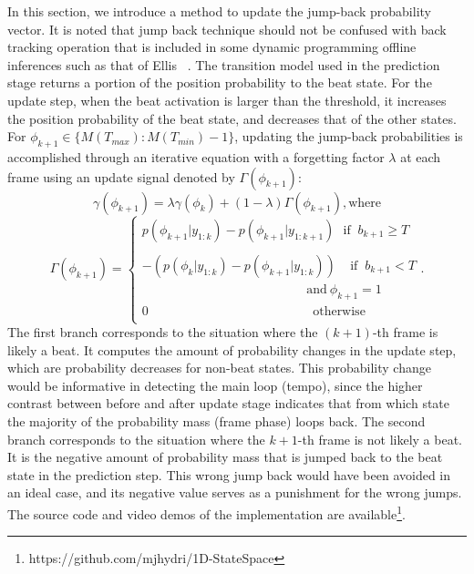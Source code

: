 \documentclass{article}
\begin{document}
In this section, we introduce a method to update the jump-back probability vector. It is noted that jump back technique should not be confused with back tracking operation that is included in some dynamic programming offline inferences such as that of Ellis ~\cite{Ellis:1}. The transition model used in the prediction stage returns a portion of the position probability to the beat state. For the update step, when the beat activation is larger than the threshold, it increases the position probability of the beat state, and decreases that of the other states. For $\phi_{k+1}\in \{M(T_{max}):M(T_{min})-1\}$, updating the jump-back probabilities is accomplished through an iterative equation with a forgetting factor $\lambda$ at each frame using an update signal denoted by $\Gamma(\phi_{k+1})$: 
\begin{equation}
\gamma(\phi_{k+1})= \lambda \gamma(\phi_{k})+ (1-\lambda) \Gamma(\phi_{k+1}), \text{where}  
\end{equation}
\begin{equation}
    \Gamma(\phi_{k+1})=
          \left\{
        \begin{array}{ll}
           p(\phi_{k+1}|y_{1:k})-p(\phi_{k+1}|y_{1:k+1})  \ \ \ \text{if }\ b_{k+1} \geq T \\     \\       -(p(\phi_{k}|y_{1:k})-p(\phi_{k+1}|y_{1:k})) \ \ \ \ \ \text{if }\ b_{k+1} < T  \\
            \qquad \qquad \qquad \qquad \qquad \qquad \ \ \ \  \text{and} \ \phi_{k+1}=1 \\
            0 \qquad \qquad \qquad \qquad \qquad \qquad \ \ \ \  \text{otherwise}\\
        \end{array}
      \right. .
\end{equation}
The first branch corresponds to the situation where the $(k+1)$-th frame is likely a beat. It computes the amount of probability changes in the update step, which are probability decreases for non-beat states. This probability change would be informative
in detecting the main loop (tempo), since the higher contrast between before and after update stage indicates that from which state the majority of the probability mass (frame phase) loops back.
The second branch corresponds to the situation where the $k+1$-th frame is not likely a beat. It is the negative amount of probability mass that is jumped back to the beat state in the prediction step. This wrong jump back would have been avoided in an ideal case, and its negative value serves as a punishment for the wrong jumps. The source code and video demos of the implementation are available\footnote{https://github.com/mjhydri/1D-StateSpace}. 
\end{document}
